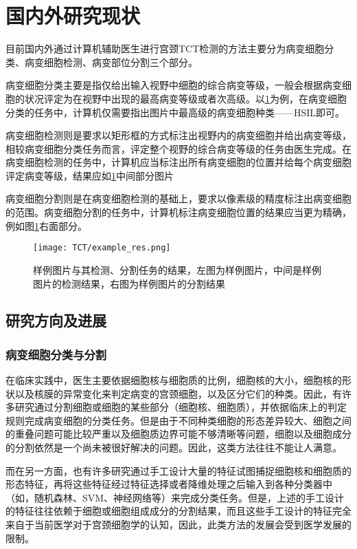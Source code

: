\section{国内外研究现状}
\par 目前国内外通过计算机辅助医生进行宫颈TCT检测的方法主要分为病变细胞分类、病变细胞检测、病变部位分割三个部分。
\par 病变细胞分类主要是指仅给出输入视野中细胞的综合病变等级，一般会根据病变细胞的状况评定为在视野中出现的最高病变等级或者次高级。以\ref{样例图片}为例，在病变细胞分类的任务中，计算机仅需要指出图片中最高级的病变细胞种类——HSIL即可。
\par 病变细胞检测则是要求以矩形框的方式标注出视野内的病变细胞并给出病变等级，相较病变细胞分类任务而言，评定整个视野的综合病变等级的任务由医生完成。在病变细胞检测的任务中，计算机应当标注出所有病变细胞的位置并给每个病变细胞评定病变等级，结果应如\ref{样例图片}中间部分图片
\par 病变细胞分割则是在病变细胞检测的基础上，要求以像素级的精度标注出病变细胞的范围。病变细胞分割的任务中，计算机标注病变细胞位置的结果应当更为精确，例如图\ref{样例图片}右面部分。

\begin{figure}[h]
    \centering
    \texttt{[image: TCT/example\_res.png]}
    \caption{样例图片与其检测、分割任务的结果，左图为样例图片，中间是样例图片的检测结果，右图为样例图片的分割结果}
    \label{样例图片}
\end{figure}

\subsection{研究方向及进展}

\subsubsection{病变细胞分类与分割}
\par 在临床实践中，医生主要依据细胞核与细胞质的比例，细胞核的大小，细胞核的形状以及核膜的异常变化来判定病变的宫颈细胞，以及区分它们的种类。因此，有许多研究\cite{zhang2014segmentation}\cite{zhang2017graph}\cite{lee2016segmentation}通过分割细胞或细胞的某些部分（细胞核、细胞质），并依据临床上的判定规则完成病变细胞的分类任务。但是由于不同种类细胞的形态差异较大、细胞之间的重叠问题可能比较严重以及细胞质边界可能不够清晰等问题，细胞以及细胞成分的分割依然是一个尚未被很好解决的问题。因此，这类方法往往不能让人满意。
\par 而在另一方面，也有许多研究\cite{marinakis2009pap}\cite{phoulady2016automatic}通过手工设计大量的特征试图捕捉细胞核和细胞质的形态特征，再将这些特征经过特征选择或者降维处理之后输入到各种分类器中（如，随机森林、SVM、神经网络等）来完成分类任务。但是，上述的手工设计的特征往往依赖于细胞或细胞组成成分的分割结果，而且这些手工设计的特征完全来自于当前医学对于宫颈细胞学的认知，因此，此类方法的发展会受到医学发展的限制。
